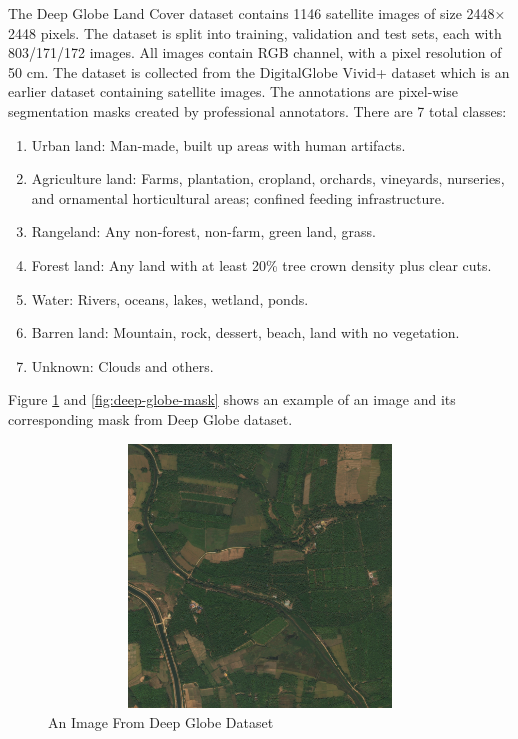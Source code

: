 The Deep Globe Land Cover dataset \cite{deep-globe} contains 1146 satellite images of size 2448×
2448 pixels. The dataset is split into training, validation and test sets, each with 803/171/172 images. All images contain RGB channel, with a pixel resolution of 50 cm. The dataset is  collected from the DigitalGlobe Vivid+ dataset which is an earlier dataset containing satellite images. The annotations are pixel-wise segmentation masks created by professional annotators. There are 7 total classes:

\begin{enumerate}
    \item Urban land: Man-made, built up areas with human artifacts.
    \item Agriculture land: Farms, plantation, cropland, orchards, vineyards, nurseries, and ornamental horticultural areas; confined feeding infrastructure.
    \item Rangeland: Any non-forest, non-farm, green land, grass.
    \item Forest land: Any land with at least 20\% tree crown density plus clear cuts.
    \item Water: Rivers, oceans, lakes, wetland, ponds.
    \item Barren land: Mountain, rock, dessert, beach, land with no vegetation.
    \item Unknown: Clouds and others.
\end{enumerate}


Figure \ref{fig:deep-globe-image} and \ref{fig:deep-globe-mask} shows an example of an image and its corresponding mask from Deep Globe dataset.

\FloatBarrier
\begin{figure}[ht]
\includegraphics[width=11.5cm, height=7cm]{images/deepglobe_img.jpg}
\centering
\caption{An Image From Deep Globe Dataset}
\label{fig:deep-globe-image}
\end{figure}

